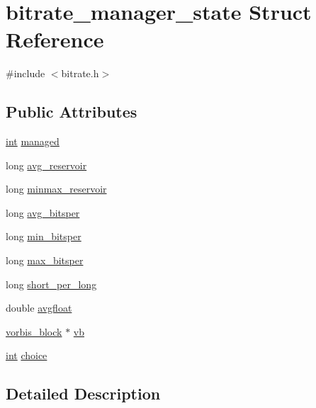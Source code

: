 \hypertarget{structbitrate__manager__state}{}\section{bitrate\+\_\+manager\+\_\+state Struct Reference}
\label{structbitrate__manager__state}


{\ttfamily \#include $<$bitrate.\+h$>$}

\subsection*{Public Attributes}
\begin{DoxyCompactItemize}
\item 
\hyperlink{xmltok_8h_a5a0d4a5641ce434f1d23533f2b2e6653}{int} \hyperlink{structbitrate__manager__state_a874d426e03e2fe791ffaa18772ec73ca}{managed}
\item 
long \hyperlink{structbitrate__manager__state_a6fc0ce1557ae9808b2390271008bce0e}{avg\+\_\+reservoir}
\item 
long \hyperlink{structbitrate__manager__state_a16a7b9cb7bcc4f9d86efef9fda083fb9}{minmax\+\_\+reservoir}
\item 
long \hyperlink{structbitrate__manager__state_a39abde2acedad23996b933837a0b72be}{avg\+\_\+bitsper}
\item 
long \hyperlink{structbitrate__manager__state_aa854e0d6bcb60dc3cf27dd5190c70345}{min\+\_\+bitsper}
\item 
long \hyperlink{structbitrate__manager__state_a48f87c07fd01af4160d38c39d17aa1f2}{max\+\_\+bitsper}
\item 
long \hyperlink{structbitrate__manager__state_a0d147df96a556b32fe5ff84d3d3b8e8f}{short\+\_\+per\+\_\+long}
\item 
double \hyperlink{structbitrate__manager__state_a97494b734f47a814b535cd8f07203a03}{avgfloat}
\item 
\hyperlink{structvorbis__block}{vorbis\+\_\+block} $\ast$ \hyperlink{structbitrate__manager__state_a79de5ce8aa30385d2b9d1c0639ef9c68}{vb}
\item 
\hyperlink{xmltok_8h_a5a0d4a5641ce434f1d23533f2b2e6653}{int} \hyperlink{structbitrate__manager__state_a705c9b3e162719911c04ab57e09d4149}{choice}
\end{DoxyCompactItemize}


\subsection{Detailed Description}


